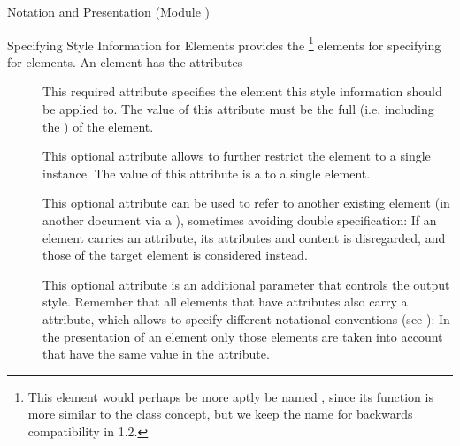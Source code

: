 \begin{tchapter}[id=pres,short=Notation and Presentation]{Notation and Presentation (Module {})}
\begin{tsection}[id=omstyle,short=Styling OMDoc Elements]{Specifying Style Information for {\omdoc} Elements}
  {\omdoc} provides the {}\footnote{This element would perhaps be more
    aptly be named {}, since its function is more similar to the {\css}
    class concept, but we keep the name {} for backwards
    compatibility in {\omdoc} 1.2.}  elements for specifying
  {} for {\omdoc} elements.  An {} element
  has the attributes
  \begin{description}
  \item[{}] This required attribute specifies the
    {\omdoc} element this style information should be applied to. The value of
    this attribute must be the full {} (i.e.  including
    the {}) of the element.
  \item[{}] This optional attribute allows
    to further restrict the {\omdoc} element to a single instance. The value of
    this attribute is a {} to a single element.
  \item[{}] This optional
    attribute can be used to refer to another existing {} element (in
    another document via a {}), sometimes avoiding double
    specification: If an {} element carries an {} attribute, its attributes and content is disregarded, and those of
    the target {} element is considered instead.
  \item[{}] This optional attribute is an
    additional parameter that controls the output style. Remember that all {\omdoc}
    elements that have {} attributes also carry a
    {} attribute, which allows to specify different notational
    conventions (see {}): In the presentation of an {\omdoc}
    element only those {} elements are taken into account that have the
    same value in the {} attribute.
    

\end{description}
\end{tsection}
\end{tchapter}
